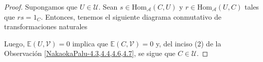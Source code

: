 \documentclass[tesis]{subfiles}
\begin{document}
\begin{proof}

    Supongamos que $U\in\mathcal{U}$. Sean $s\in\text{Hom}_\mathscr{A}(C,U)$ y $r\in\text{Hom}_\mathscr{A}(U,C)$ tales que $rs = 1_C$. Entonces, tenemos el siguiente diagrama conmutativo de transformaciones naturales
    \begin{center}
    \end{center}
    Luego, $\mathbb{E}(U,\mathcal{V}) = 0$ implica que $\mathbb{E}(C,\mathcal{V}) = 0$ y, del inciso (2) de la Observación \ref{NakaokaPalu-4.3,4.4,4.6,4.7}, se sigue que $C\in\mathcal{U}$.
\end{proof}
\end{document}

